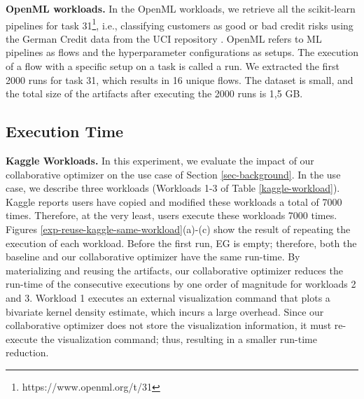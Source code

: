 \textbf{OpenML workloads.} In the OpenML workloads, we retrieve all the scikit-learn pipelines for task 31\footnote{https://www.openml.org/t/31}, i.e., classifying customers as good or bad credit risks using the German Credit data from the UCI repository \cite{asuncion2007uci}.
OpenML refers to ML pipelines as flows and the hyperparameter configurations as setups.
The execution of a flow with a specific setup on a task is called a run.
We extracted the first 2000 runs for task 31, which results in 16 unique flows. 
The dataset is small, and the total size of the artifacts after executing the 2000 runs is 1,5 GB.

\subsection{Execution Time}
\textbf{Kaggle Workloads.}
In this experiment, we evaluate the impact of our collaborative optimizer on the use case of Section \ref{sec-background}.
In the use case, we describe three workloads (Workloads 1-3 of Table \ref{kaggle-workload}).
Kaggle reports users have copied and modified these workloads a total of 7000 times.
Therefore, at the very least, users execute these workloads 7000 times.
Figures \ref{exp-reuse-kaggle-same-workload}(a)-(c) show the result of repeating the execution of each workload.
Before the first run, EG is empty; therefore, both the baseline and our collaborative optimizer have the same run-time.
By materializing and reusing the artifacts, our collaborative optimizer reduces the run-time of the consecutive executions by one order of magnitude for workloads 2 and 3.
Workload 1 executes an external visualization command that plots a bivariate kernel density estimate, which incurs a large overhead.
Since our collaborative optimizer does not store the visualization information, it must re-execute the visualization command; thus, resulting in a smaller run-time reduction.
